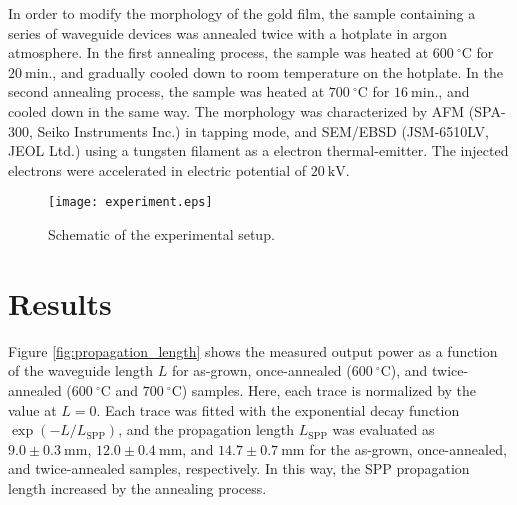 \documentclass[aip,apl,reprint]{revtex4-1}
\begin{document}
In order to modify the morphology of the gold film, the sample containing a series of waveguide devices was annealed twice with a hotplate in argon atmosphere\cite{Nogues}.
In the first annealing process, the sample was heated at $600\:^\circ\mathrm{C}$ for $20\:\mathrm{min}$., and gradually cooled down to room temperature on the hotplate. In the second annealing process, the sample was heated at $700\:^\circ\mathrm{C}$ for $16\:\mathrm{min}$., and cooled down in the same way. The morphology was characterized by AFM (SPA-300, Seiko Instruments Inc.) in tapping mode, and SEM/EBSD (JSM-6510LV, JEOL Ltd.) using a tungsten filament as a electron thermal-emitter. The injected electrons were accelerated in electric potential of $20\:\mathrm{kV}$.

\begin{figure}
    \texttt{[image: experiment.eps]}
    \caption{Schematic of the experimental setup.}
     \label{fig:experiment}
\end{figure}

\section{Results}
\label{sec:result}
Figure \ref{fig:propagation_length} shows the measured output power as a function of the waveguide length $L$ for as-grown, once-annealed ($600\:^\circ\mathrm{C}$), and twice-annealed ($600\:^\circ\mathrm{C}$ and $700\:^\circ\mathrm{C}$) samples.
Here, each trace is normalized by the value at $L=0$.
Each trace was fitted with the exponential decay function $\exp(-L/L_{\mathrm{SPP}})$, and the propagation length $L_{\mathrm{SPP}}$ was evaluated as $9.0\pm0.3\:\mathrm{mm}$, $12.0\pm0.4\:\mathrm{mm}$, and $14.7\pm0.7\:\mathrm{mm}$ for the as-grown, once-annealed, and twice-annealed samples, respectively.
In this way, the SPP propagation length increased by the annealing process.
\end{document}
